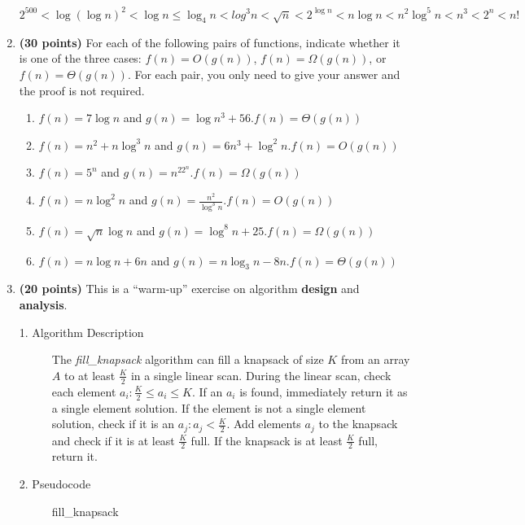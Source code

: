 \documentclass[11pt]{article}
\begin{document}
\begin{enumerate}
\vspace{-0.4in}

\[2^{500} < \log(\log n)^2 < \log n \leq \log_4 n < log^3 n < \sqrt{n} < 2^{\log n} < n\log n < n^2 \log^5 n < n^3 < 2^n < n!\]
\item
{\bf (30 points)}
For each of the following pairs of functions, indicate
whether it is one of the three cases: $f(n)=O(g(n))$, $f(n)=\Omega(g(n))$, or $f(n)=\Theta(g(n))$. For each pair, you only need to give your answer and the proof is not required.


\begin{enumerate}
\item $f(n)=7\log n$ and $g(n)=\log n^3 + 56$.\hfill $f(n)=\Theta(g(n))$
\item $f(n)=n^2+n\log^3 n$ and $g(n)=6n^3+\log^2n$.\hfill $f(n)=O(g(n))$
\item $f(n)=5^n$ and $g(n)=n^22^n$.\hfill $f(n)=\Omega(g(n))$
\item $f(n)=n\log^2n$ and $g(n)=\frac{n^2}{\log^3 n}$.\hfill $f(n)=O(g(n))$
\item $f(n)=\sqrt{n}\log n$ and $g(n)=\log^8n+25$.\hfill $f(n)=\Omega(g(n))$
\item $f(n)= n\log n+6n$ and $g(n) = n\log_3 n-8n$.\hfill $f(n)=\Theta(g(n))$
\end{enumerate}



\newpage
\item
{\bf (20 points)}
This is a ``warm-up'' exercise on algorithm {\bf design} and {\bf analysis}.

\begin{description}

\item[1. Algorithm Description]

  The \textit{fill\_knapsack} algorithm can fill a knapsack of size $K$ from an array $A$ to at least $\frac{K}{2}$ in a single linear scan. During the linear scan, check each element $a_i : \frac{K}{2} \leq a_i \leq K$. If an $a_i$ is found, immediately return it as a single element solution. If the element is not a single element solution, check if it is an $a_j : a_j < \frac{K}{2}$. Add elements $a_j$ to the knapsack and check if it is at least $\frac{K}{2}$ full. If the knapsack is at least $\frac{K}{2}$ full, return it.

\vspace{0.1in}
\item[2. Pseudocode]
fill\_knapsack


\end{description}
\end{enumerate}
\end{document}
